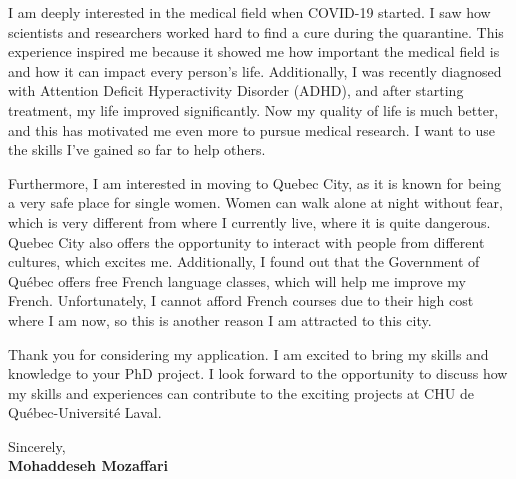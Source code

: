 \documentclass[letterpaper,11pt]{letter}
\begin{document}
I am deeply interested in the medical field when COVID-19 started. I saw how scientists and researchers worked hard to find a cure during the quarantine. This experience inspired me because it showed me how important the medical field is and how it can impact every person's life. Additionally, I was recently diagnosed with Attention Deficit Hyperactivity Disorder (ADHD), and after starting treatment, my life improved significantly. Now my quality of life is much better, and this has motivated me even more to pursue medical research. I want to use the skills I’ve gained so far to help others.

Furthermore, I am interested in moving to Quebec City, as it is known for being a very safe place for single women. Women can walk alone at night without fear, which is very different from where I currently live, where it is quite dangerous. Quebec City also offers the opportunity to interact with people from different cultures, which excites me. Additionally, I found out that the Government of Québec offers free French language classes, which will help me improve my French. Unfortunately, I cannot afford French courses due to their high cost where I am now, so this is another reason I am attracted to this city.
  
Thank you for considering my application. I am excited to bring my skills and knowledge to your PhD project. I look forward to the opportunity to discuss how my skills and experiences can contribute to the exciting projects at CHU de Québec-Université Laval.


\begin{flushleft}
    Sincerely, \\
    \textbf{Mohaddeseh Mozaffari}
\end{flushleft}
\end{document}
